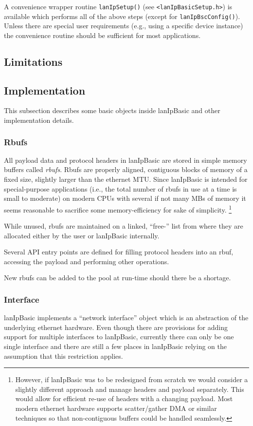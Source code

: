 \documentclass{article}
\newcommand{\lip}{lanIpBasic}
\newcommand{\ethn}{ethernet}
\newcommand{\rbuf}{{rbuf}}
\newcommand{\Rbuf}{{Rbuf}}
\newcommand{\lipc}[1]{{\tt #1}}
\begin{document}
A convenience wrapper routine \lipc{lanIpSetup()}
(see \lipc{<lanIpBasicSetup.h>}) is available which performs all of
the above steps (except for \lipc{lanIpBscConfig()}). Unless
there are special user requirements (e.g., using a specific device
instance) the convenience routine should be sufficient for
most applications.
  \subsection{Limitations}
  \subsection{Implementation}
This subsection describes some basic objects inside 
\lip{} and other implementation details.
    \subsubsection{\Rbuf{}s}
All payload data and protocol headers in \lip{} are stored
in simple memory buffers called {\em \rbuf{}s}. \Rbuf{}s are
properly aligned, contiguous blocks of memory of a fixed size,
slightly larger than the \ethn{} MTU. Since \lip{} is intended for 
special-purpose applications (i.e., the total number of \rbuf{}s
in use at a time is small to moderate) on modern CPUs with several
if not many MBs of memory it seems reasonable to sacrifice 
some memory-efficiency for sake of simplicity.%
\footnote{
  However, if \lip{} was to be redesigned from scratch we would
  consider a slightly different approach and manage headers and
  payload separately. This would allow for efficient re-use of
  headers with a changing payload. Most modern \ethn{} hardware
  supports scatter/gather DMA or similar techniques so that
  non-contiguous buffers could be handled seamlessly.%
}

While unused, \rbuf{}s are maintained on a linked, ``free-'' list
from where they are allocated either by the user or \lip{} 
internally.

Several API entry points are defined for filling protocol
headers into an \rbuf, accessing the payload and performing
other operations.

New \rbuf{}s can be added to the pool at run-time should there
be a shortage.
	\subsubsection{Interface}
\lip{} implements a ``network interface'' object which is an abstraction
of the underlying \ethn{} hardware. Even though there are provisions
for adding support for multiple interfaces to \lip{}, currently there
can only be one single interface and there are still a few places
in \lip{} relying on the assumption that this restriction applies.
\end{document}
